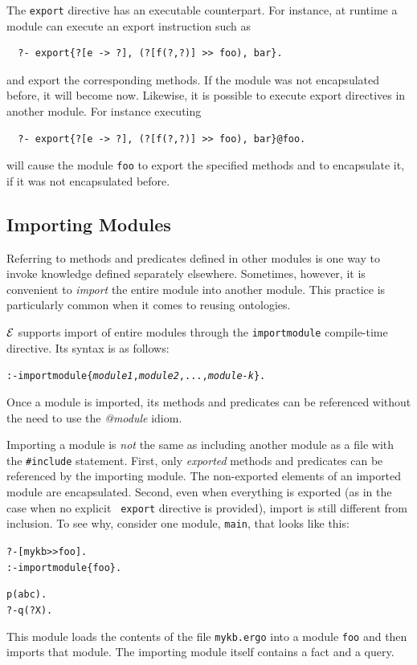 \documentclass[11pt]{article}
\newcommand{\ERGO}{\mbox{\ensuremath{\cal{E}}\smaller{{\sc{RGO}}}}\xspace}
\newcommand{\FLSYSTEM}{\ERGO}
\newcommand{\ergoext}{ergo\xspace}
\begin{document}
The {\tt export} directive has an executable counterpart. For instance, at
runtime a module can execute an export instruction such as 
\begin{verbatim}
  ?- export{?[e -> ?], (?[f(?,?)] >> foo), bar}.
\end{verbatim}
and export the corresponding methods. If the module was not encapsulated
before, it will become now. Likewise, it is possible to execute export
directives in another module. For instance executing
\begin{verbatim}
  ?- export{?[e -> ?], (?[f(?,?)] >> foo), bar}@foo.
\end{verbatim}
will cause the module {\tt foo} to export the specified methods and to
encapsulate it, if it was not encapsulated before. 


\subsection{Importing Modules}\label{sec-module-import}

Referring to methods and predicates defined in other modules is one way to
invoke knowledge defined separately elsewhere. Sometimes, however,
it is convenient to \emph{import} the entire module into another module.
This practice is particularly common when it comes to reusing ontologies.

\FLSYSTEM supports import of entire modules through the {\tt importmodule}
compile-time directive. Its syntax is as follows:

\begin{alltt}
 :- importmodule\{\textit{module1}, \textit{module2}, ..., \textit{module-k}\}.
\end{alltt}

Once a module is imported, its methods and predicates can be referenced
without the need to use the \emph{@module} idiom. 

Importing a module is \emph{not} the same as including another module as a
file with the {\tt \#include} statement. First, only \emph{exported}
methods and predicates can be referenced by the importing module.
The non-exported elements of an imported module are encapsulated.
Second,
even when everything is exported (as in the case when no explicit {\tt
  export} directive is provided), import is still different from inclusion.
To see why, consider one module, {\tt main}, that looks like this:

\begin{alltt}
  ?- [mykb>{}>foo].
  :- importmodule\{foo\}.

  p(abc).
  ?- q(?X).
\end{alltt}
This module loads the contents of the file {\tt mykb.\ergoext} into a module
{\tt foo} and then imports that module.  
The importing module itself contains a fact and a query.
\end{document}
